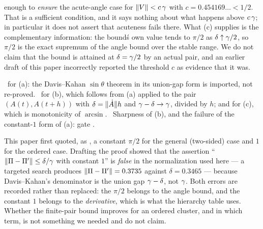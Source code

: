 \begin{theorem}
\begin{enumerate}[label=(\alph*)]
enough to \emph{ensure} the acute-angle case for $\lVert V\rVert<c\,\gamma$ with
$c=0.454169\ldots<1/2$. That is a sufficient condition, and it says nothing about what
happens above $c\,\gamma$; in particular it does not assert that acuteness fails there. What
(c) supplies is the complementary information: the bound\'s own value tends to $\pi/2$ as
$\delta\uparrow\gamma/2$, so $\pi/2$ is the exact supremum of the angle bound over the stable
range. We do not claim that the bound is attained at $\delta=\gamma/2$ by an actual pair, and
an earlier draft of this paper incorrectly reported the threshold $c$ as evidence that it was.
\end{enumerate}
\Cc\ for (a): the Davis--Kahan $\sin\theta$ theorem in its union-gap form is imported, not
re-proved. \T\ for (b), which follows from (a) applied to the pair $(A(t),A(t+h))$ with
$\delta=\lVert\dot A\rVert h$ and $\gamma-\delta\to\gamma$, divided by $h$; and for (c), which is
monotonicity of $\arcsin$. \V\ Sharpness of (b), and the failure of the constant-$1$ form of
(a): gate .
\end{theorem}

\begin{remark}\label{rem:piover2}
This paper first quoted, as \Cc, a constant $\pi/2$ for the general (two-sided) case and $1$ for
the ordered case. Drafting the proof showed that the assertion ``$\lVert\Pi-\Pi'\rVert\le
\delta/\gamma$ with constant $1$'' is \emph{false} in the normalization used here --- a targeted
search produces $\lVert\Pi-\Pi'\rVert=0.3735$ against $\delta=0.3465$ --- because Davis--Kahan's
denominator is the union gap $\gamma-\delta$, not $\gamma$. Both errors are recorded rather than
replaced: the $\pi/2$ belongs to the angle bound, and the constant $1$ belongs to the
\emph{derivative}, which is what the hierarchy table uses. Whether the finite-pair bound improves for an ordered
cluster, and in which term, is not something we needed and do not claim.
\end{remark}

